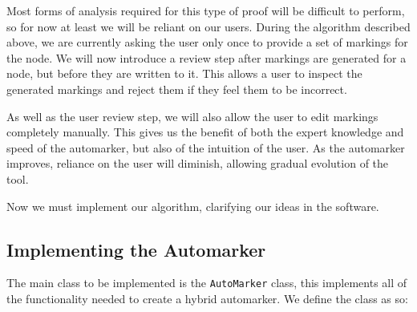 \documentclass{report}
\begin{document}
Most forms of analysis required for this type of proof will be difficult to perform, so for now at least we will be reliant on our users. During the
algorithm described above, we are currently asking the user only once to provide a set of markings for the node. We will now introduce a review step
after markings are generated for a node, but before they are written to it. This allows a user to inspect the generated markings and reject them if
they feel them to be incorrect.

As well as the user review step, we will also allow the user to edit markings completely manually. This gives us the benefit of both the expert
knowledge and speed of the automarker, but also of the intuition of the user. As the automarker improves, reliance on the user will diminish, allowing
gradual evolution of the tool.

Now we must implement our algorithm, clarifying our ideas in the software.

\subsection{Implementing the Automarker}

The main class to be implemented is the \texttt{AutoMarker} class, this implements all of the functionality needed to create a hybrid automarker.
We define the class as so:
\end{document}
